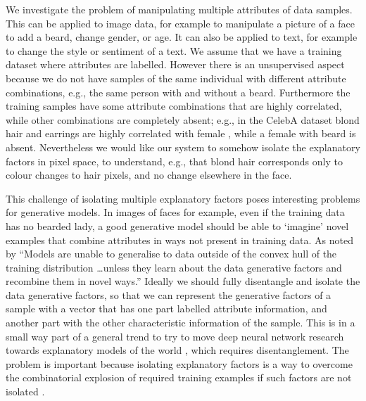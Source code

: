 \documentclass{article}
\begin{document}
We investigate the problem of manipulating multiple attributes of  data samples. This can be applied to image data, for example to manipulate a picture of a face to add a beard, change gender, or age. It can also be applied to text, for example to change the style or sentiment of a text. We assume that we have a training dataset where attributes are labelled. However there is an unsupervised aspect because we do not have samples of the same individual with different attribute combinations, e.g., the same person with and without a beard. Furthermore the training samples have some attribute combinations that are highly correlated, while other combinations are completely absent; e.g., in the CelebA dataset blond hair and earrings are highly correlated with female \cite{celebacorrel}, while a female with beard is absent. Nevertheless we would like our system to somehow isolate the explanatory factors in pixel space, to understand, e.g., that blond hair corresponds only to colour changes to hair pixels, and no change elsewhere in the face.


This challenge of isolating multiple explanatory factors poses interesting problems for generative models.
In images of faces for example, even if the training data has no bearded lady, a good generative model should be able to `imagine' novel examples that combine attributes in ways not present in training data.
As noted by \citet{HigginsBVAEearly} ``Models are unable to generalise to data outside of the convex hull of the training
distribution \ldots unless they learn about the data generative factors and recombine them
in novel ways.'' 
Ideally we should fully disentangle and isolate the data generative factors, so that we can represent the generative factors of a sample with a vector that has one part labelled attribute information, and another part with the other characteristic information of the sample. 
This is in a small way part of a general trend  to try to move deep neural network research towards explanatory models of the world \cite{LeCunpower2018,LakeBBSarxiv2016,DBLP:journals/corr/abs-1805-04025}, which requires disentanglement.
The problem is important because isolating explanatory factors is a way to overcome the combinatorial explosion  of required training examples if such factors are not isolated \cite{DBLP:journals/corr/abs-1805-04025}.
\end{document}
